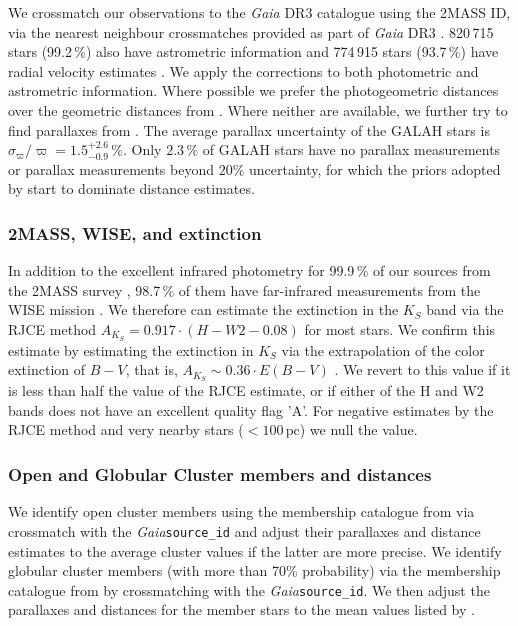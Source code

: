 \documentclass[
  journal=pasa,
  manuscript=research-paper, %
  year=2023,
  volume=37
]{cup-journal}
\newcommand{\Gaia}{\textit{Gaia}\xspace}
\begin{document}
We crossmatch our observations to the \Gaia DR3 catalogue \citep{Brown2021,Vallenari2022} using the 2MASS ID, via the nearest neighbour crossmatches provided as part of \Gaia DR3 \citep{Torra2021}. 820\,715 stars (99.2\,\%) also have astrometric information \citep{Lindegren2021a} and 774\,915 stars (93.7\,\%) have radial velocity estimates \citep{Katz2022}. We apply the corrections to both photometric \citep{Riello2021} and astrometric \citep{Lindegren2021b}information. Where possible we prefer the photogeometric distances over the geometric distances from \citep{BailerJones2021}. Where neither are available, we further try to find parallaxes from \cite{vanLeeuwen2007}. The average parallax uncertainty of the GALAH stars is $\sigma_{\varpi} / \varpi = 1.5_{-0.9}^{+2.6}\,\mathrm{\%}$. Only $2.3\,\%$ of GALAH stars have no parallax measurements or parallax measurements beyond $20\%$ uncertainty, for which the priors adopted by \citep{BailerJones2021} start to dominate distance estimates.

\subsubsection{2MASS, WISE, and extinction}

In addition to the excellent infrared photometry for 99.9\,\% of our sources from the 2MASS survey \citep{Skrutskie2006}, 98.7\,\% of them have far-infrared measurements from the WISE mission \citep{Cutri2013}. We therefore can estimate the extinction in the $K_S$ band via the RJCE method \citep{Majewski2011} $A_{K_S}  = 0.917 \cdot \left( H - W2 - 0.08 \right)$ for most stars. We confirm this estimate by estimating the extinction in $K_S$ via the extrapolation of the color extinction of $B-V$, that is, $A_{K_S} \sim 0.36 \cdot E(B-V)$ \citep{Cardelli1989}. We revert to this value if it is less than half the value of the RJCE estimate, or if either of the H and W2 bands does not have an excellent quality flag 'A'. For negative estimates by the RJCE method and very nearby stars ($<100\,\mathrm{pc}$) we null the value.

\subsubsection{Open and Globular Cluster members and distances} \label{sec:oc_gc}

We identify open cluster members using the membership catalogue from \citet{CantatGaudin2020} via crossmatch with the \Gaia \texttt{source\_id} and adjust their parallaxes and distance estimates to the average cluster values if the latter are more precise. We identify globular cluster members (with more than 70\% probability) via the membership catalogue from \citet{Vasiliev2021} by crossmatching with the \Gaia \texttt{source\_id}. We then adjust the parallaxes and distances for the member stars to the mean values listed by \citet{Baumgardt2021}.
\end{document}
